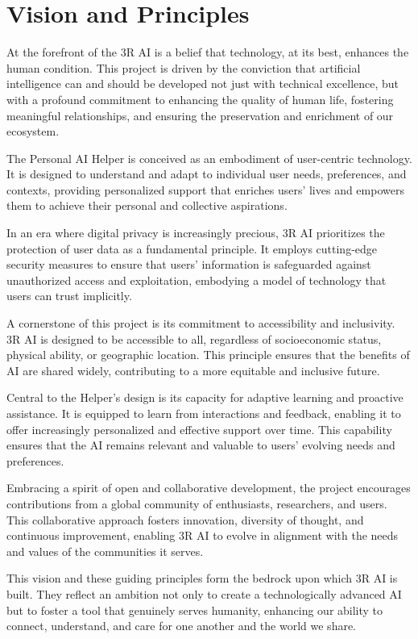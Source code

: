 \documentclass[12pt]{article}
\begin{document}
\section*{Vision and Principles}

At the forefront of the 3R AI is a belief that technology, at its best, enhances the human condition. This project is driven by the conviction that artificial intelligence can and should be developed not just with technical excellence, but with a profound commitment to enhancing the quality of human life, fostering meaningful relationships, and ensuring the preservation and enrichment of our ecosystem.

The Personal AI Helper is conceived as an embodiment of user-centric technology. It is designed to understand and adapt to individual user needs, preferences, and contexts, providing personalized support that enriches users' lives and empowers them to achieve their personal and collective aspirations.

In an era where digital privacy is increasingly precious, 3R AI prioritizes the protection of user data as a fundamental principle. It employs cutting-edge security measures to ensure that users' information is safeguarded against unauthorized access and exploitation, embodying a model of technology that users can trust implicitly.

A cornerstone of this project is its commitment to accessibility and inclusivity. 3R AI is designed to be accessible to all, regardless of socioeconomic status, physical ability, or geographic location. This principle ensures that the benefits of AI are shared widely, contributing to a more equitable and inclusive future.

Central to the Helper's design is its capacity for adaptive learning and proactive assistance. It is equipped to learn from interactions and feedback, enabling it to offer increasingly personalized and effective support over time. This capability ensures that the AI remains relevant and valuable to users' evolving needs and preferences.


Embracing a spirit of open and collaborative development, the project encourages contributions from a global community of enthusiasts, researchers, and users. This collaborative approach fosters innovation, diversity of thought, and continuous improvement, enabling 3R AI to evolve in alignment with the needs and values of the communities it serves.

This vision and these guiding principles form the bedrock upon which 3R AI is built. They reflect an ambition not only to create a technologically advanced AI but to foster a tool that genuinely serves humanity, enhancing our ability to connect, understand, and care for one another and the world we share.
\end{document}
